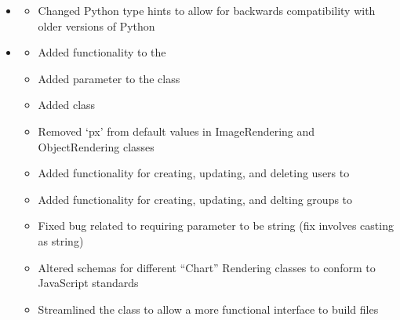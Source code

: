 \documentclass[letterpaper,10pt,english]{sphinxmanual}
\begin{document}
\begin{itemize}
\begin{description}
\begin{itemize}
\end{itemize}

\end{description}

\item {} \begin{description}
\begin{itemize}
\item {} 
\sphinxAtStartPar
Changed Python type hints to allow for backwards compatibility with older versions of Python

\end{itemize}

\end{description}

\item {} \begin{description}
\begin{itemize}
\item {} 
\sphinxAtStartPar
Added functionality to the 

\item {} 
\sphinxAtStartPar
Added  parameter to the  class

\item {} 
\sphinxAtStartPar
Added  class

\item {} 
\sphinxAtStartPar
Removed ‘px’ from default values in ImageRendering and ObjectRendering classes

\item {} 
\sphinxAtStartPar
Added functionality for creating, updating, and deleting users to 

\item {} 
\sphinxAtStartPar
Added functionality for creating, updating, and delting groups to 

\item {} 
\sphinxAtStartPar
Fixed bug related to requiring  parameter to be string (fix involves casting as string)

\item {} 
\sphinxAtStartPar
Altered schemas for different “Chart” Rendering classes to conform to JavaScript standards

\item {} 
\sphinxAtStartPar
Streamlined the  class to allow a more functional interface to build  files


\end{itemize}
\end{description}
\end{itemize}
\end{document}
